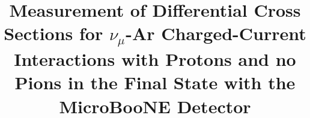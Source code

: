 \documentclass[%
twocolumn,
 amsmath,amssymb,
 aps,
prd,
superscriptaddress,showpacs]{revtex4-2}
\begin{document}

\newcommand{\numu}{$\nu_\mu$\xspace}
\newcommand{\nue}{$\nu_e$\xspace}
\newcommand{\nuebar}{$\overline{\nu}_e$\xspace}
\newcommand{\dcp}{$\delta_{CP}$\xspace}
\newcommand{\thtt}{$\theta_{23}$\newcommand}
\newcommand{\dmsq}{$|\Delta m^2_{32}|$\xspace}
\newcommand{\nova}{NOvA\xspace}
\newcommand{\mb}{MiniBooNE\xspace}
\newcommand{\mub}{MicroBooNE\xspace}
\newcommand{\nuance}{\textsc{nuance}}
\newcommand{\minerva}{MINERvA\xspace}
\newcommand{\addcite}{{\color{red} ADD CITATION}~}
\newcommand{\tmu}{\ensuremath{T_{\mu}}\xspace}
\newcommand{\pmu}{\ensuremath{|\textbf{p}_{\mu}|}\xspace}
\newcommand{\cost}{\ensuremath{\cos{\theta_{\mu}}}\xspace}
\newcommand{\enu}{\ensuremath{E_{\nu}}\xspace}
\newcommand{\qq}{\ensuremath{Q^{2}}\xspace}
\newcommand{\enuqe}{\ensuremath{E_{\nu}^{\textrm{QE}}}\xspace}
\newcommand{\qqqe}{\ensuremath{Q^{2}_{\textrm{QE}}}\xspace}
\newcommand{\pf}{\ensuremath{p_{F}}\xspace}
\newcommand{\eb}{\ensuremath{E_{b}}\xspace}
\newcommand{\carbon}{C\ensuremath{^{12}}\xspace}
\newcommand{\oxygen}{O\ensuremath{^{16}}\xspace}
\newcommand{\ma}{\ensuremath{M_{\textrm{A}}}\xspace}
 \newcommand{\maeff}{\ensuremath{M^{\mbox{\scriptsize{eff}}}_{\textrm{A}}}\xspace}
\newcommand{\mares}{\ensuremath{M^{\mbox{\scriptsize{RES}}}_{\textrm{A}}}\xspace}
\newcommand{\maqe}{\ensuremath{M_{\textrm{A}}^{\mbox{\scriptsize{QE}}}}\xspace}
\newcommand{\rpm}{\raisebox{.2ex}{$\scriptstyle\pm$}}



\title{Measurement of Differential Cross Sections for $\nu_\mu$-Ar Charged-Current Interactions with Protons and no Pions in the Final State with the MicroBooNE Detector}
\end{document}
